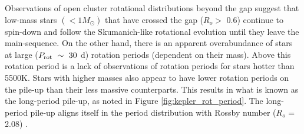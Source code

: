 %

Observations of open cluster rotational distributions beyond the gap suggest that low-mass stars $\left( < 1 M_{\odot}\right)$ that have crossed the gap ($R_o>\,\,$0.6) continue to spin-down and follow the Skumanich-like rotational evolution until they leave the main-sequence.
On the other hand, there is an apparent overabundance of stars at large ($P_{\rm{rot}} \ \sim \ 30$ d) rotation periods (dependent on their mass). 
Above this rotation period is a lack of observations of rotation periods for stars hotter than 5500K.
Stars with higher masses also appear to have lower rotation periods on the pile-up than their less massive counterparts.
This results in what is known as the long-period pile-up, as noted in Figure \ref{fig:kepler_rot_period}.
The long-period pile-up aligns itself in the \citet{mcquillan_rotation_2014} period distribution with Rossby number  ($R_o$ = 2.08) \citep{van_saders_forward_2019}.
 
